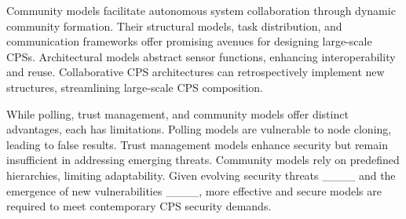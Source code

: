 Community models facilitate autonomous system collaboration through dynamic community formation. Their structural models, task distribution, and communication frameworks offer promising avenues for designing large-scale CPSs. Architectural models abstract sensor functions, enhancing interoperability and reuse. Collaborative CPS architectures can retrospectively implement new structures, streamlining large-scale CPS composition.

While polling, trust management, and community models offer distinct advantages, each has limitations. Polling models are vulnerable to node cloning, leading to false results. Trust management models enhance security but remain insufficient in addressing emerging threats. Community models rely on predefined hierarchies, limiting adaptability. Given evolving security threats ____ and the emergence of new vulnerabilities ____, more effective and secure models are required to meet contemporary CPS security demands.